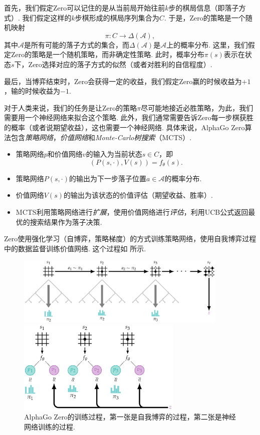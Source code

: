 首先，我们假定Zero可以记住的是从当前局开始往前$k$步的棋局信息（即落子方式）. 我们假定这样的$k$步棋形成的棋局序列集合为$C$. 于是，Zero的策略是一个随机映射
\[\pi: C\to \Delta(\mathcal A),\]
其中$\mathcal A$是所有可能的落子方式的集合，而$\Delta(\mathcal A)$是$\mathcal A$上的概率分布. 这里，我们假定Zero的策略是一个随机策略，而非确定性策略. 此时，概率分布$\pi(s)$表示在状态$s$下，Zero选择对应的落子方式的似然（或者对胜利的自信程度）.

最后，当博弈结束时，Zero会获得一定的收益，我们假定Zero赢的时候收益为$+1$，输的时候收益为$-1$. 

对于人类来说，我们的任务是让Zero的策略$\pi$尽可能地接近必胜策略，为此，我们需要用一个神经网络来拟合这个策略. 此外，我们通常需要告诉Zero每一步棋获胜的概率（或者说期望收益），这也需要一个神经网络. 具体来说，AlphaGo Zero算法包含\textit{策略网络}，\textit{价值网络}和\textit{Monte-Carlo树搜索}（MCTS）.
\begin{itemize}
    \item 策略网络$p$和价值网络$v$的输入为当前状态$s\in C$，即
    \[(P(s,\cdot),V(s))=f_\theta(s).\]
    \item 策略网络$P(s,\cdot)$的输出为下一步落子位置$a\in\mathcal A$的概率分布.
    \item 价值网络$V(s)$的输出为该状态的价值评估（期望收益、胜率）.
    \item MCTS利用策略网络进行\textit{扩展}，使用价值网络进行\textit{评估}，利用UCB公式返回最优的搜索结果作为落子决策.
\end{itemize}

Zero使用强化学习（自博弈，策略梯度）的方式训练策略网络，使用自我博弈过程中的数据监督训练价值网络. 这个过程如 所示.

\begin{figure}[ht]
\centering
\includegraphics[width=0.9\textwidth]{figures/game/self-play.pdf}
\vspace{1.5em}

\includegraphics[width=0.7\textwidth]{figures/game/network-training.pdf}
\caption{AlphaGo Zero的训练过程，第一张是自我博弈的过程，第二张是神经网络训练的过程. }
\label{fig:alphago-zero}
\end{figure}

